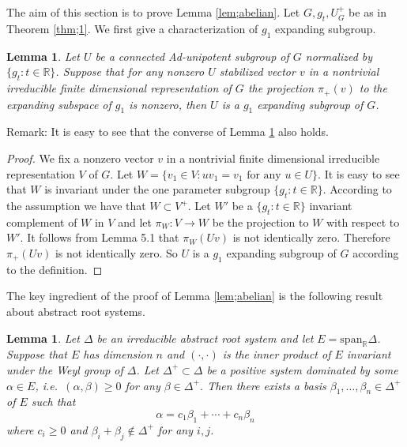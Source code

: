 \documentclass[12pt]{amsart}
\newtheorem{lem}[thm]{Lemma}
\theoremstyle{definition}
\theoremstyle{remark}
\numberwithin{equation}{section}
\begin{document}
\appendix
\section{}
The aim of this section is to prove  Lemma \ref{lem;abelian}. 
Let $G, g_t, U_G^+$ be as  in  Theorem \ref{thm;1}.
We first give a characterization of $g_1$ expanding subgroup.
\begin{lem}\label{lem;characterize}
Let $U$ be a connected  Ad-unipotent subgroup of $G$ normalized 
by $\{g_t:t\in \mathbb R\}$.
 Suppose that for any nonzero $U$ stabilized  vector $v$ in  a  
 nontrivial 
irreducible finite dimensional representation of $G$
  the projection 
 $\pi_+(v)$
 to the expanding subspace of $g_1$ is nonzero, 
 then $U$ is a $g_1$ expanding subgroup of $G$.
 \end{lem}
 Remark: It is easy to see that  the converse of Lemma \ref{lem;characterize} also holds. 
 \begin{proof}
 We fix a nonzero vector $v$ in  a  nontrivial 
 finite dimensional irreducible  representation $V$ of $G$. 
 Let $W=\{v_1\in V: uv_1=v _1\mbox{ for any } u\in U\}$. It is easy
 to see that $W$ is invariant under the one parameter subgroup $\{g_t: t\in \mathbb R\}$. 
 According to the assumption we have that $W\subset V^+$. 
 Let $W'$ be a $\{g_t: t\in \mathbb R\}$ invariant   complement of $W$ in $V$
 and let $\pi_W: V\to W$ be the projection to $W$ with respect to $W'$. 
 It follows from \cite{s96} Lemma 5.1 that $\pi_W(Uv)$ is not identically zero. 
 Therefore $\pi_+(Uv)$ is not identically zero. So 
 $U$ is a $g_1$ expanding subgroup of $G$ according to the definition.
 \end{proof}

The key ingredient of the proof of Lemma \ref{lem;abelian} is the following 
result about abstract root systems.

\begin{lem}\label{lem;root}
Let $\Delta$ be an irreducible abstract root system  and let
 $E=\mathrm{span}_{\mathbb R}\Delta $.
 Suppose that $E$  has dimension $n$ and 
 $(\cdot, \cdot)$ is the inner product of $E$ invariant under the Weyl group of $\Delta$.    Let $\Delta^+\subset \Delta$ be a positive system dominated by 
some $\alpha\in E$, i.e.~$(\alpha, \beta)\ge 0 $ for any $\beta\in \Delta^+$. Then there exists a basis  $\beta_1, \ldots, \beta_n\in \Delta^+$ of $E$   such that 
\begin{equation}\label{eq;linearly}
\alpha=c_1\beta_1+\cdots +c_n\beta_n
\end{equation}
where  $c_i\ge 0$ and $\beta_i+\beta_j\not\in \Delta^+$ for any $i,j$.
\end{lem}
\end{document}
